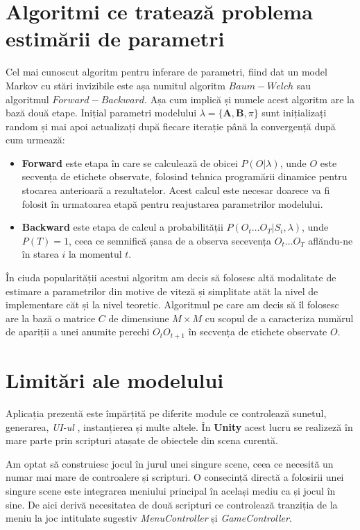 \section{Algoritmi ce tratează problema estimării de parametri}
Cel mai cunoscut algoritm pentru inferare de parametri, fiind dat un model Markov cu stări invizibile este așa numitul algoritm $Baum-Welch$ sau algoritmul $Forward-Backward$. Așa cum implică și numele acest algoritm are la bază două etape. Inițial parametri modelului $\lambda = \{\textbf{A},\textbf{B},\pi\}$ sunt inițializați random și mai apoi actualizați după fiecare iterație până la convergență după cum urmează:
\begin{itemize}
\item{\textbf{Forward} este etapa în care se calculează de obicei $P(O|\lambda)$, unde $O$ este secvența de etichete observate, folosind tehnica programării dinamice pentru stocarea anterioară a rezultatelor. Acest calcul este necesar doarece va fi folosit în urmatoarea etapă pentru reajustarea parametrilor modelului.}
\item{\textbf{Backward} este etapa de calcul a probabilității $P(O_{t}\dots O_{T}| S_{i},\lambda)$, unde $P(T) = 1$, ceea ce semnifică șansa de a observa secevența $O_{t}\dots O_{T}$ aflăndu-ne în starea $i$ la momentul $t$}.
\end{itemize}
\par

În ciuda popularității acestui algoritm am decis să folosesc altă modalitate de estimare a parametrilor din motive de viteză și simplitate atăt la nivel de implementare căt și la nivel teoretic. Algoritmul pe care am decis să îl folosesc are la bază o matrice $C$ de dimensiune $M\times M$ cu scopul de a caracteriza numărul de apariții a unei anumite perechi $O_{t}O_{t+1}$ în secvența de etichete observate $O$.\par

\section{Limitări ale modelului}
Aplicația prezentă este împărțită pe diferite module ce controlează sunetul, generarea, \textit{UI-ul} , instanțierea și multe altele. În \textbf{Unity} acest lucru se realizeză în mare parte prin scripturi atașate de obiectele din scena curentă. \par
Am optat să construiesc jocul în jurul unei singure scene, ceea ce necesită un numar mai mare de controalere și scripturi. O consecință directă a folosirii unei singure scene este integrarea meniului principal în același mediu ca și jocul în sine. De aici derivă necesitatea de două scripturi ce controlează tranziția de la meniu la joc intitulate sugestiv \textit{MenuController} și \textit{GameController}.\par

